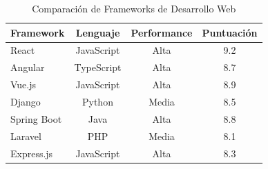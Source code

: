 \begin{table}[htbp]
\centering
\caption{Comparación de Frameworks de Desarrollo Web}
\label{tab:frameworks}
\small
\begin{tabular}{lccc}
\toprule
\textbf{Framework} & \textbf{Lenguaje} & \textbf{Performance} & \textbf{Puntuación} \\
\midrule
React & JavaScript & Alta & 9.2 \\
Angular & TypeScript & Alta & 8.7 \\
Vue.js & JavaScript & Alta & 8.9 \\
Django & Python & Media & 8.5 \\
Spring Boot & Java & Alta & 8.8 \\
Laravel & PHP & Media & 8.1 \\
Express.js & JavaScript & Alta & 8.3 \\
\bottomrule
\end{tabular}
\end{table}